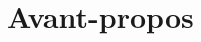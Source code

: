\section*{\huge Avant-propos}
\vspace{2cm}
    \hfill\begin{minipage}{0.5\linewidth}
    


\end{minipage}


\newpage